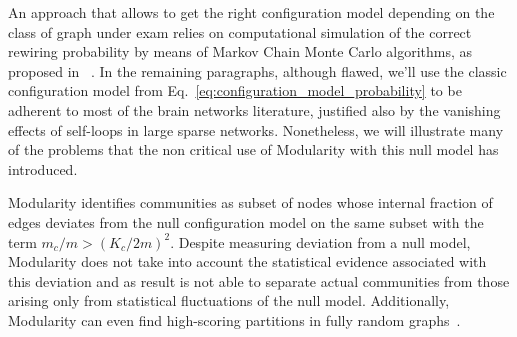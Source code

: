 An approach that allows to get the right configuration model depending on the class of graph under exam relies on computational simulation of the correct rewiring probability by means of Markov Chain Monte Carlo algorithms, as proposed in ~\cite{Fosdick2016}.
In the remaining paragraphs, although flawed, we'll use the classic configuration model from Eq.~\ref{eq:configuration_model_probability} to be adherent to most of the brain networks literature, justified also by the vanishing effects of self-loops in large sparse networks. Nonetheless, we will illustrate many of the problems that the non critical use of Modularity with this null model has introduced.


Modularity identifies communities as subset of nodes whose internal fraction of edges deviates from the null configuration model on the same subset with the term $m_c/m > (K_c/2m)^2$. Despite measuring deviation from a null model, Modularity does not take into account the statistical evidence associated with this deviation and as result is not able to separate actual communities from those arising only from statistical fluctuations of the null model. Additionally, Modularity can even find high-scoring partitions in fully random graphs~\cite{Guimera2004}.

